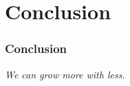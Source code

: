 
\section{Conclusion}

\begin{frame}
    \frametitle{Conclusion}
    \begin{center}
        {\Large
            \textit{We can grow more with less.}
        }
    \end{center}
\end{frame}